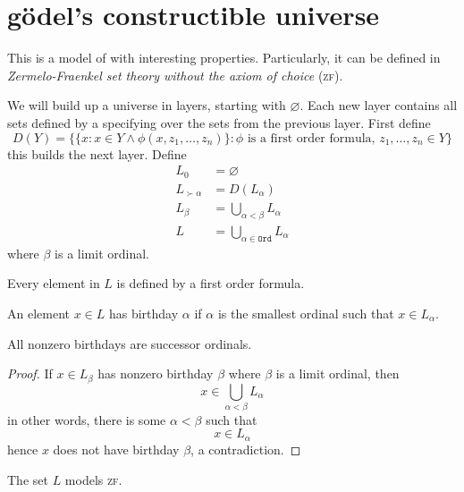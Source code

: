 \message{ !name(truth.tex)}\documentclass{scrbook}
\newcommand{\ord}{\texttt{Ord}}
\renewcommand{\emptyset}{\varnothing}
\begin{document}
\section[Gödel's constructible universe]{gödel's constructible universe}
This is a model of \zfc with interesting properties. Particularly, it can be defined in \emph{Zermelo-Fraenkel set theory without the axiom of choice} (\textsc{zf}). 
\begin{defn}
  We will build up a universe in layers, starting with $\emptyset$. Each new layer contains all sets defined by a specifying over the sets from the previous layer.
  First define
  \[
  D(Y) = \bigl\{ \{x : x \in Y \wedge \phi(x,z_1,\dots,z_n)\} : \phi \textrm{ is a first order formula, } z_1,\dots,z_n\in Y\bigr\} 
  \]
  this builds the next layer. 
  Define
  \begin{align*}
    L_0 &= \emptyset \\
    L_{\succ \alpha} &= D(L_\alpha) \\
    L_\beta &= \bigcup_{\alpha <\beta} L_\alpha \\
    L &= \bigcup_{\alpha\in \ord} L_\alpha
  \end{align*}
  where $\beta$ is a limit ordinal.

  Every element in $L$ is defined by a first order formula. 
\end{defn}
\begin{defn}[birthday]
  An element $x\in L$ has birthday $\alpha$ if $\alpha$ is the smallest ordinal such that $x\in L_\alpha$. 
\end{defn}
\begin{lemma}
  All nonzero birthdays are successor ordinals.
\end{lemma}
\begin{proof}
  If $x\in L_\beta$ has nonzero birthday $\beta$ where $\beta$ is a limit ordinal, then 
  \[
  x\in \bigcup_{\alpha <\beta} L_\alpha
  \]
  in other words, there is some $\alpha<\beta$ such that
  \[
  x\in L_\alpha
  \]
  hence $x$ does not have birthday $\beta$, a contradiction.
\end{proof}
\begin{theorem}
  The set $L$ models \textsc{zf}.
\end{theorem}
\end{document}

